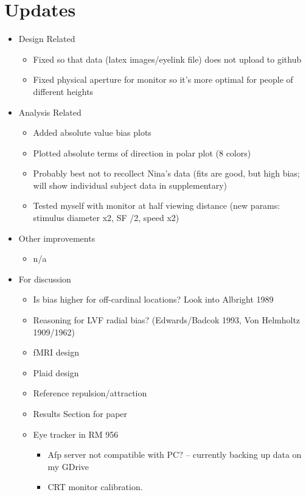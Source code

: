 \documentclass[11pt]{article} %
\begin{document}
\section{Updates} 
\begin{itemize}
\item Design Related
	\begin{itemize}
	\item Fixed so that data (latex images/eyelink file) does not upload to github
	\item Fixed physical aperture for monitor so it's more optimal for people of different heights
	\end{itemize}
\item Analysis Related
	\begin{itemize}
	\item Added absolute value bias plots
	\item Plotted absolute terms of direction in polar plot (8 colors)
	\item Probably best not to recollect Nina's data (fits are good, but high bias; will show individual subject data in supplementary)
	\item Tested myself with monitor at half viewing distance (new params: stimulus diameter x2, SF /2, speed x2)
	\end{itemize}
\item Other improvements
	\begin{itemize}
	\item n/a
	\end{itemize}
\item For discussion
	\begin{itemize}
	\item Is bias higher for off-cardinal locations? Look into Albright 1989
	\item Reasoning for LVF radial bias? (Edwards/Badcok 1993, Von Helmholtz 1909/1962)
	\item fMRI design
	\item Plaid design
	\item Reference repulsion/attraction
	\item Results Section for paper
	\item Eye tracker in RM 956
		\begin{itemize}
			\item{Afp server not compatible with PC? -- currently backing up data on my GDrive}
			\item{CRT monitor calibration.}
		\end{itemize}
	\end{itemize}
\end{itemize}
\end{document}
